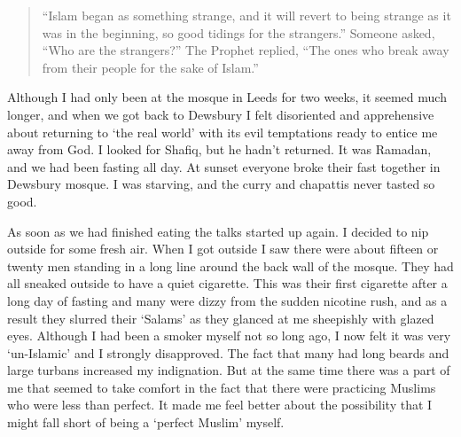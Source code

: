 \documentclass[12pt]{memoir}
\begin{document}
\begin{quote}
“Islam began as something strange,
and it will revert to being strange as it was in the beginning,
so good tidings for the strangers.”
Someone asked, “Who are the strangers?”
The Prophet replied,
“The ones who break away from their people for the sake of Islam.”
\end{quote}

Although I had only been at the mosque in Leeds for two weeks,
it seemed much longer, and when we got back to Dewsbury I felt disoriented
and apprehensive about returning to ‘the real world’
with its evil temptations ready to entice me away from God.
I looked for Shafiq, but he hadn’t returned.
It was  Ramadan, %
and we had been fasting all day.
At sunset everyone broke their fast together in Dewsbury mosque.
I was starving, and the curry and chapattis never tasted so good.

As soon as we had finished eating the talks started up again.
I decided to nip outside for some fresh air.
When I got outside I saw there were about fifteen or twenty men
standing in a long line around the back wall of the mosque.
They had all sneaked outside to have a quiet cigarette.
This was their first cigarette after a long day of fasting
and many were dizzy from the sudden nicotine rush,
and as a result they slurred their ‘Salams’
as they glanced at me sheepishly with glazed eyes.
Although I had been a smoker myself not so long ago,
I now felt it was very ‘un-Islamic’ and I strongly disapproved.
The fact that many had long beards and large turbans increased my indignation.
But at the same time there was a part of me that seemed to take comfort
in the fact that there were practicing Muslims who were less than perfect.
It made me feel better about the possibility
that I might fall short of being a ‘perfect Muslim’ myself.
\end{document}

